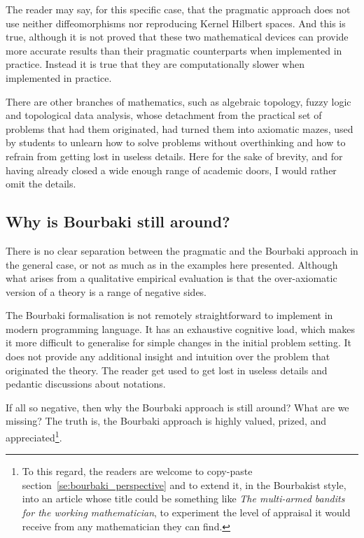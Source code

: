\documentclass[]{scrartcl}
\begin{document}
The reader may say, for this specific case, that the pragmatic approach \cite{modersitzki2004numerical} does not use neither diffeomorphisms nor reproducing Kernel Hilbert spaces. And this is true, although it is not proved that these two mathematical devices can provide more accurate results than their pragmatic counterparts when implemented in practice. Instead it is true that they are computationally slower when implemented in practice.

There are other branches of mathematics, such as algebraic topology, fuzzy logic and topological data analysis, whose detachment from the practical set of problems that had them originated, had turned them into axiomatic mazes, used by students to unlearn how to solve problems without overthinking and how to refrain from getting lost in useless details. Here for the sake of brevity, and for having already closed a wide enough range of academic doors, I would rather omit the details.

\subsection*{Why is Bourbaki still around?}

There is no clear separation between the pragmatic and the Bourbaki approach in the general case, or not as much as in the examples here presented. Although what arises from a qualitative empirical evaluation is that the over-axiomatic version of a theory is a range of negative sides.

The Bourbaki formalisation is not remotely straightforward to implement in modern programming language. It has an exhaustive cognitive load, which makes it more difficult to generalise for simple changes in the initial problem setting. It does not provide any additional insight and intuition over the problem that originated the theory. The reader get used to get lost in useless details and pedantic discussions about notations.

If all so negative, then why the Bourbaki approach is still around? What are we missing? The truth is, the Bourbaki approach is highly valued, prized, and appreciated\footnote{
    To this regard, the readers are welcome to copy-paste section~\ref{se:bourbaki_perspective} and to extend it, in the Bourbakist style, into an article whose title could be something like \emph{The multi-armed bandits for the working mathematician}, to experiment the level of appraisal it would receive from any mathematician they can find.
}.
\end{document}
